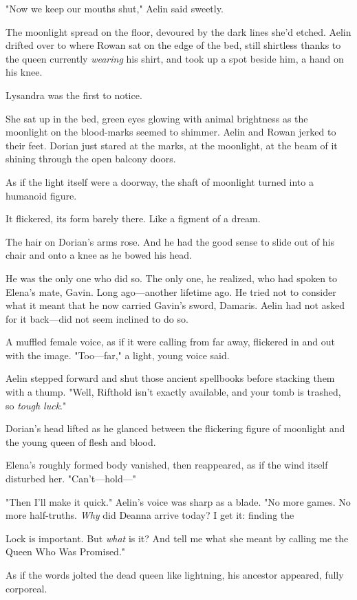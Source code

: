 "Now we keep our mouths shut," Aelin said sweetly.

The moonlight spread on the floor, devoured by the dark lines she'd etched. Aelin drifted over to where Rowan sat on the edge of the bed, still shirtless thanks to the queen currently \emph{wearing} his shirt, and took up a spot beside him, a hand on his knee.

Lysandra was the first to notice.

She sat up in the bed, green eyes glowing with animal brightness as the moonlight on the blood-marks seemed to shimmer. Aelin and Rowan jerked to their feet. Dorian just stared at the marks, at the moonlight, at the beam of it shining through the open balcony doors.

As if the light itself were a doorway, the shaft of moonlight turned into a humanoid figure.

It flickered, its form barely there. Like a figment of a dream.

The hair on Dorian's arms rose. And he had the good sense to slide out of his chair and onto a knee as he bowed his head.

He was the only one who did so. The only one, he realized, who had spoken to Elena's mate, Gavin. Long ago---another lifetime ago. He tried not to consider what it meant that he now carried Gavin's sword, Damaris. Aelin had not asked for it back---did not seem inclined to do so.

A muffled female voice, as if it were calling from far away, flickered in and out with the image. "Too---far," a light, young voice said.

Aelin stepped forward and shut those ancient spellbooks before stacking them with a thump. "Well, Rifthold isn't exactly available, and your tomb is trashed, so \emph{tough luck}."

Dorian's head lifted as he glanced between the flickering figure of moonlight and the young queen of flesh and blood.

Elena's roughly formed body vanished, then reappeared, as if the wind itself disturbed her. "Can't---hold---"

"Then I'll make it quick." Aelin's voice was sharp as a blade. "No more games. No more half-truths. \emph{Why} did Deanna arrive today? I get it: finding the

Lock is important. But \emph{what} is it? And tell me what she meant by calling me the Queen Who Was Promised."

As if the words jolted the dead queen like lightning, his ancestor appeared, fully corporeal.

